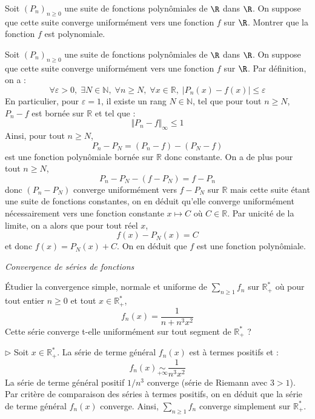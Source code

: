 \documentclass[a4paper,10pt]{report}
\newcommand{\Sum}[2]{\ensuremath{\textstyle{\sum\limits_{#1}^{#2}}}}
\begin{document}
\medskip


\begin{Exercice}{} Soit $(P_{n})_{n \geq 0}$ une suite de fonctions polynômiales de $\R$ dans $\R$. On suppose que cette suite converge uniformément vers une fonction $f$ sur $\R$. Montrer que la fonction $f$ est polynomiale.
\end{Exercice}

\corr Soit $(P_{n})_{n \geq 0}$ une suite de fonctions polynômiales de $\R$ dans $\R$. On suppose que cette suite converge uniformément vers une fonction $f$ sur $\R$. Par définition, on a :
$$ \forall \varepsilon >0, \; \exists N \in \mathbb{N}, \; \forall n \geq N, \;  \forall x \in \mathbb{R}, \; \vert P_n(x)-f(x) \vert \leq \varepsilon$$
En particulier, pour $\varepsilon=1$, il existe un rang $N \in \mathbb{N}$, tel que pour tout $n \geq N$, $P_n-f$ est bornée sur $\mathbb{R}$ et tel que :
$$ \Vert P_n- f \Vert_{\infty} \leq 1$$
Ainsi, pour tout $n \geq N$,
$$ P_n-P_N = (P_n-f)-(P_N-f)$$
est une fonction polynômiale bornée sur $\mathbb{R}$ donc constante. On a de plus pour tout $n \geq N$,
$$ P_n-P_N - (f-P_N) = f-P_n$$
donc $(P_n-P_N)$ converge uniformément vers $f-P_N$ sur $\mathbb{R}$ mais cette suite étant une suite de fonctions constantes, on en déduit qu'elle converge uniformément nécessairement vers une fonction constante $x \mapsto C$ où $C \in \mathbb{R}$. Par unicité de la limite, on a alors que pour tout réel $x$,
$$ f(x)-P_N(x)=C$$
et donc $f(x)=P_N(x)+C$. On en déduit que $f$ est une fonction polynômiale.

\medskip

\begin{center}
\textit{{ {\large Convergence de séries de fonctions}}}
\end{center}

\medskip

\begin{Exercice}{} Étudier la convergence simple, normale et uniforme de $\Sum{n\geq 1}{} f_n$ sur $\mathbb{R}_+^*$ où pour tout entier $n \geq 0$ et tout $x \in \mathbb{R}_+^*$, 
$$ f_n(x) = \frac{1}{n+n^3x^2}$$
Cette série converge t-elle uniformément sur tout segment de $\mathbb{R}_+^*$ ?
\end{Exercice} 

\corr 

\noindent $\rhd$ Soit $x \in \mathbb{R}_+^*$. La série de terme général $f_n(x)$ est à termes positifs et :
$$ f_n(x) \underset{+ \infty}{\sim} \dfrac{1}{n^3x^2}$$
La série de terme général positif $1/n^3$ converge (série de Riemann avec $3>1$). Par critère de comparaison des séries à termes positifs, on en déduit que la série de terme général $f_n(x)$ converge. Ainsi, $\Sum{n\geq 1}{} f_n$ converge simplement sur $\mathbb{R}_+^*$.
\end{document}
